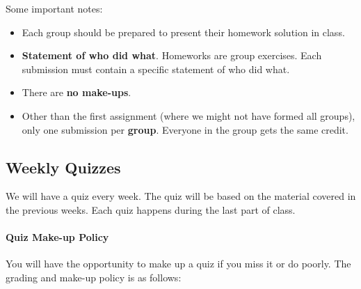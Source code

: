 \documentclass[11pt]{article}
\begin{document}
Some important notes:

\begin{itemize}
\item
Each group should be prepared to present their homework solution in
class.

\item
  \textbf{Statement of who did what}. Homeworks are group exercises.
  Each submission must contain a specific statement of who did what.
\item
  There are \textbf{no make-ups}.
\item
  Other than the first assignment (where we might not have formed all
  groups), only one submission per \textbf{\textbf{group}}. Everyone in
  the group gets the same credit.
\end{itemize}

\subsection{Weekly Quizzes}\label{weekly-quizzes}

We will have a quiz every week. The quiz will be based on the material covered in the previous weeks. Each quiz happens during the last part of class.


\paragraph{Quiz Make-up Policy} You will have the opportunity to make up a quiz if you miss it or do poorly. The grading and make-up policy is as follows:
\end{document}
